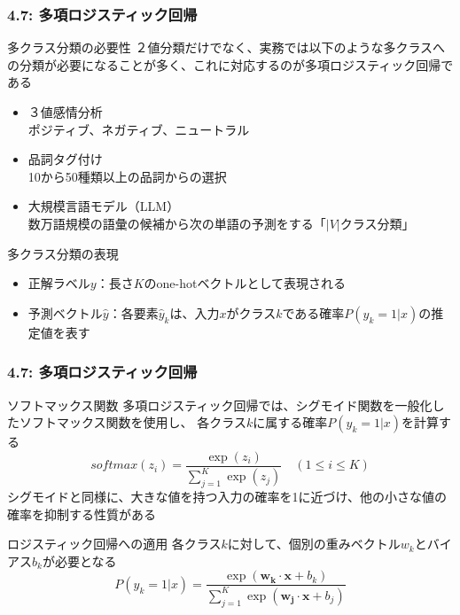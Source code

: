 \documentclass[unicode,11pt]{beamer} %
\begin{document}
\begin{frame}
    \frametitle{4.7: 多項ロジスティック回帰}
    \begin{alertblock}{多クラス分類の必要性}
        ２値分類だけでなく、実務では以下のような多クラスへの分類が必要になることが多く、これに対応するのが多項ロジスティック回帰である
        \begin{itemize}
            \item ３値感情分析\\ポジティブ、ネガティブ、ニュートラル
            \item 品詞タグ付け\\10から50種類以上の品詞からの選択
            \item 大規模言語モデル（LLM）\\数万語規模の語彙の候補から次の単語の予測をする「$|V|$クラス分類」
        \end{itemize}
    \end{alertblock}
    \begin{alertblock}{多クラス分類の表現}
        \begin{itemize}
            \item 正解ラベル$y$：長さ$K$のone-hotベクトルとして表現される
            \item 予測ベクトル$\hat{y}$：各要素$\hat{y}_k$は、入力$x$がクラス$k$である確率$P(y_k = 1|x)$の推定値を表す
        \end{itemize}
    \end{alertblock}
\end{frame}

\begin{frame}
    \frametitle{4.7: 多項ロジスティック回帰}
    \begin{alertblock}{ソフトマックス関数}
        多項ロジスティック回帰では、シグモイド関数を一般化したソフトマックス関数を使用し、
        各クラス$k$に属する確率$P(y_k = 1 | x)$を計算する
        \begin{equation*}
            softmax(z_i) = \frac{\exp (z_i)}{\sum_{j=1}^K \exp (z_j)} \quad (1 \le i \le K)
        \end{equation*}
        シグモイドと同様に、大きな値を持つ入力の確率を1に近づけ、他の小さな値の確率を抑制する性質がある
    \end{alertblock}
    \begin{alertblock}{ロジスティック回帰への適用}
        各クラス$k$に対して、個別の重みベクトル$w_k$とバイアス$b_k$が必要となる
        \begin{equation*}
            P(y_k = 1|x) = \frac{\exp (\boldsymbol{w_k} \cdot \boldsymbol{x} + b_k)}{\sum_{j=1}^K \exp (\boldsymbol{w_j} \cdot \boldsymbol{x} + b_j)}
        \end{equation*}
    \end{alertblock}
\end{frame}
\end{document}
